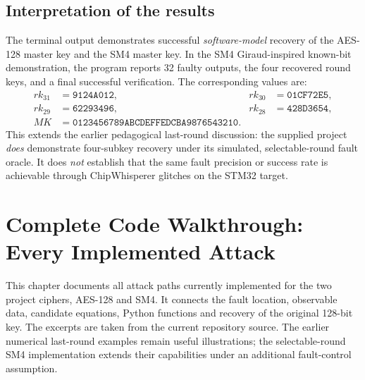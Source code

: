 \documentclass[11pt,a4paper]{report}
\newcommand{\hex}[1]{\texttt{#1}}
\begin{document}
\section{Interpretation of the results}
The terminal output demonstrates successful \emph{software-model} recovery of the AES-128 master key and the SM4 master key. In the SM4 Giraud-inspired known-bit demonstration, the program reports 32 faulty outputs, the four recovered round keys, and a final successful verification. The corresponding values are:
\begin{align*}
rk_{31}&=\hex{9124A012}, & rk_{30}&=\hex{01CF72E5},\\
rk_{29}&=\hex{62293496}, & rk_{28}&=\hex{428D3654},\\
MK&=\hex{0123456789ABCDEFFEDCBA9876543210}.
\end{align*}
This extends the earlier pedagogical last-round discussion: the supplied project \emph{does} demonstrate four-subkey recovery under its simulated, selectable-round fault oracle. It does \emph{not} establish that the same fault precision or success rate is achievable through ChipWhisperer glitches on the STM32 target.


\chapter{Complete Code Walkthrough: Every Implemented Attack}
\label{chap:all-attacks-code}
This chapter documents all attack paths currently implemented for the two project ciphers, AES-128 and SM4. It connects the fault location, observable data, candidate equations, Python functions and recovery of the original 128-bit key. The excerpts are taken from the current repository source. The earlier numerical last-round examples remain useful illustrations; the selectable-round SM4 implementation extends their capabilities under an additional fault-control assumption.
\end{document}
